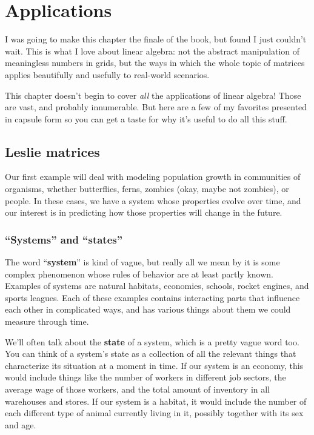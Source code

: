 
\chapter{Applications}

I was going to make this chapter the finale of the book, but found I just
couldn't wait. This is what I love about linear algebra: not the abstract
manipulation of meaningless numbers in grids, but the ways in which the whole
topic of matrices applies beautifully and usefully to real-world scenarios.

This chapter doesn't begin to cover \textit{all} the applications of linear
algebra! Those are vast, and probably innumerable. But here are a few of my
favorites presented in capsule form so you can get a taste for why it's useful
to do all this stuff.

\section{Leslie matrices}


Our first example will deal with modeling population growth in communities of
organisms, whether butterflies, ferns, zombies (okay, maybe not zombies), or
people. In these cases, we have a system whose properties evolve over time, and
our interest is in predicting how those properties will change in the future.

\subsection{``Systems'' and ``states''}


The word ``\textbf{system}'' is kind of vague, but really all we mean by it is
some complex phenomenon whose rules of behavior are at least partly known.
Examples of systems are natural habitats, economies, schools, rocket engines,
and sports leagues. Each of these examples contains interacting parts that
influence each other in complicated ways, and has various things about them we
could measure through time.


We'll often talk about the \textbf{state} of a system, which is a pretty vague
word too. You can think of a system's state as a collection of all the relevant
things that characterize its situation at a moment in time. If our system is an
economy, this would include things like the number of workers in different job
sectors, the average wage of those workers, and the total amount of inventory
in all warehouses and stores. If our system is a habitat, it would include the
number of each different type of animal currently living in it, possibly
together with its sex and age.

